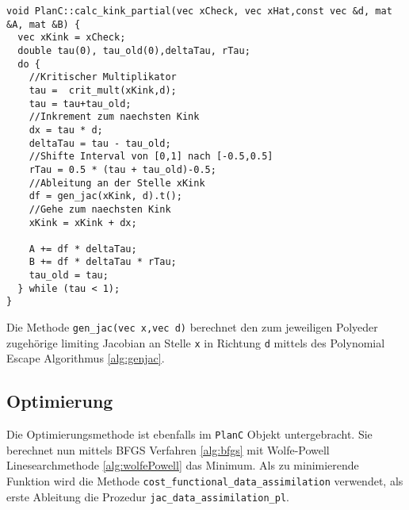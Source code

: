 \begin{lstlisting}[caption=Berechnung der gewichteten Ableitung, label=lst:kinkPartials]
void PlanC::calc_kink_partial(vec xCheck, vec xHat,const vec &d, mat &A, mat &B) {
  vec xKink = xCheck;
  double tau(0), tau_old(0),deltaTau, rTau;
  do {
    //Kritischer Multiplikator
    tau =  crit_mult(xKink,d);
    tau = tau+tau_old;
    //Inkrement zum naechsten Kink
    dx = tau * d;
    deltaTau = tau - tau_old;
    //Shifte Interval von [0,1] nach [-0.5,0.5]
    rTau = 0.5 * (tau + tau_old)-0.5;
    //Ableitung an der Stelle xKink
    df = gen_jac(xKink, d).t();
    //Gehe zum naechsten Kink
    xKink = xKink + dx;

    A += df * deltaTau;
    B += df * deltaTau * rTau;
    tau_old = tau;
  } while (tau < 1);
}
\end{lstlisting}

Die Methode \texttt{gen\_jac(vec x,vec d)} berechnet den zum jeweiligen Polyeder zugehörige limiting Jacobian an Stelle \texttt{x} in Richtung \texttt{d} mittels des Polynomial Escape Algorithmus \ref{alg:genjac}. 


\subsection{Optimierung}
Die Optimierungsmethode ist ebenfalls im \texttt{PlanC} Objekt untergebracht. Sie berechnet nun mittels BFGS Verfahren \ref{alg:bfgs} mit Wolfe-Powell Linesearchmethode \ref{alg:wolfePowell} das Minimum. 
Als zu minimierende Funktion wird die Methode \texttt{cost\_functional\_data\_assimilation} verwendet, als erste Ableitung die Prozedur \texttt{jac\_data\_assimilation\_pl}. 

% 
